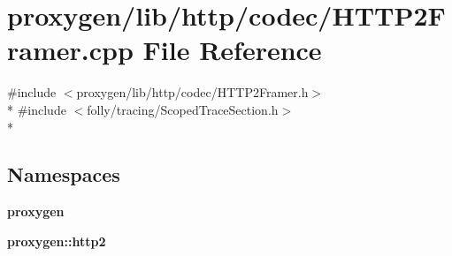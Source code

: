 \section{proxygen/lib/http/codec/\+H\+T\+T\+P2\+Framer.cpp File Reference}
\label{HTTP2Framer_8cpp}
{\ttfamily \#include $<$proxygen/lib/http/codec/\+H\+T\+T\+P2\+Framer.\+h$>$}\\*
{\ttfamily \#include $<$folly/tracing/\+Scoped\+Trace\+Section.\+h$>$}\\*
\subsection*{Namespaces}
\begin{DoxyCompactItemize}
\item 
 {\bf proxygen}
\item 
 {\bf proxygen\+::http2}
\end{DoxyCompactItemize}
